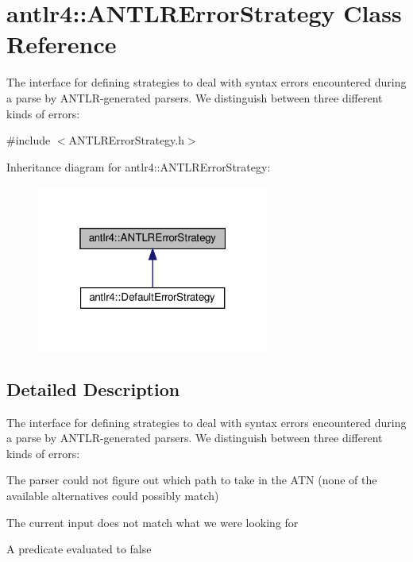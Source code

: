 \hypertarget{classantlr4_1_1ANTLRErrorStrategy}{}\section{antlr4\+:\+:A\+N\+T\+L\+R\+Error\+Strategy Class Reference}
\label{classantlr4_1_1ANTLRErrorStrategy}


The interface for defining strategies to deal with syntax errors encountered during a parse by A\+N\+T\+L\+R-\/generated parsers. We distinguish between three different kinds of errors\+:  




{\ttfamily \#include $<$A\+N\+T\+L\+R\+Error\+Strategy.\+h$>$}



Inheritance diagram for antlr4\+:\+:A\+N\+T\+L\+R\+Error\+Strategy\+:
\nopagebreak
\begin{figure}[H]
\begin{center}
\leavevmode
\includegraphics[width=217pt]{classantlr4_1_1ANTLRErrorStrategy__inherit__graph}
\end{center}
\end{figure}


\subsection{Detailed Description}
The interface for defining strategies to deal with syntax errors encountered during a parse by A\+N\+T\+L\+R-\/generated parsers. We distinguish between three different kinds of errors\+: 


\begin{DoxyItemize}
\item The parser could not figure out which path to take in the A\+TN (none of the available alternatives could possibly match) 
\item The current input does not match what we were looking for 
\item A predicate evaluated to false 
\end{DoxyItemize}


